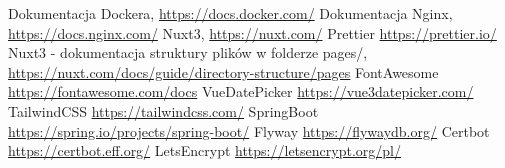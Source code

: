 \documentclass[shortabstract]{iithesis}
\begin{document}
\label{subsec:Certbot}


\begin{thebibliography}{1}
     Dokumentacja Dockera, \url{https://docs.docker.com/}
     Dokumentacja Nginx, \url{https://docs.nginx.com/}
     Nuxt3, \url{https://nuxt.com/}
     Prettier \url{https://prettier.io/}
     Nuxt3 - dokumentacja struktury plików w folderze pages/, \url{https://nuxt.com/docs/guide/directory-structure/pages}
     FontAwesome \url{https://fontawesome.com/docs}
     VueDatePicker \url{https://vue3datepicker.com/}
     TailwindCSS \url{https://tailwindcss.com/}
     SpringBoot \url{https://spring.io/projects/spring-boot/}
     Flyway \url{https://flywaydb.org/}
     Certbot \url{https://certbot.eff.org/}
     LetsEncrypt \url{https://letsencrypt.org/pl/}
\end{thebibliography}
\end{document}

